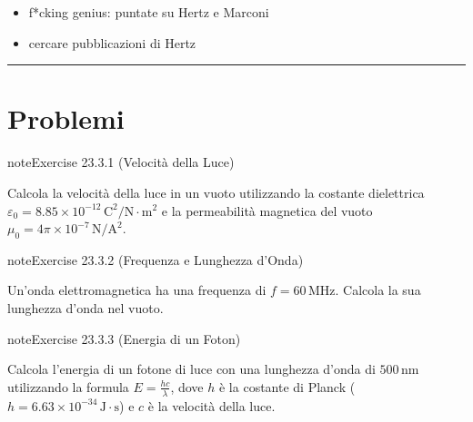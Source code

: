 \documentclass[letterpaper,10pt,italian]{jupyterBook}
\begin{document}
\sphinxAtStartPar
{}
\begin{itemize}
\item {} 
\sphinxAtStartPar
f*cking genius: puntate su Hertz e Marconi

\item {} 
\sphinxAtStartPar
cercare pubblicazioni di Hertz

\end{itemize}


\bigskip\hrule\bigskip


\sphinxstepscope


\section{Problemi}
\label{\detokenize{ch/electromagnetism/em-waves-problems:problemi}}\label{\detokenize{ch/electromagnetism/em-waves-problems:physics-hs-electromagnetism-em-waves-problems}}\label{\detokenize{ch/electromagnetism/em-waves-problems::doc}} \label{exercise:ch/electromagnetism/em-waves-problems-exercise-0}

\begin{sphinxadmonition}{note}{Exercise 23.3.1 (Velocità della Luce)}



\sphinxAtStartPar
Calcola la velocità della luce in un vuoto utilizzando la costante dielettrica \(\varepsilon_0 = 8.85 \times 10^{-12} \, \text{C}^2/\text{N} \cdot \text{m}^2\) e la permeabilità magnetica del vuoto \(\mu_0 = 4\pi \times 10^{-7} \, \text{N}/\text{A}^2\).
\end{sphinxadmonition}
 \label{exercise:ch/electromagnetism/em-waves-problems-exercise-1}

\begin{sphinxadmonition}{note}{Exercise 23.3.2 (Frequenza e Lunghezza d’Onda)}



\sphinxAtStartPar
Un’onda elettromagnetica ha una frequenza di \(f = 60 \, \text{MHz}\). Calcola la sua lunghezza d’onda nel vuoto.
\end{sphinxadmonition}
 \label{exercise:ch/electromagnetism/em-waves-problems-exercise-2}

\begin{sphinxadmonition}{note}{Exercise 23.3.3 (Energia di un Foton)}



\sphinxAtStartPar
Calcola l’energia di un fotone di luce con una lunghezza d’onda di \(500 \, \text{nm}\) utilizzando la formula \(E = \frac{h c}{\lambda}\), dove \(h\) è la costante di Planck (\(h = 6.63 \times 10^{-34} \, \text{J} \cdot \text{s}\)) e \(c\) è la velocità della luce.
\end{sphinxadmonition}
 \label{exercise:ch/electromagnetism/em-waves-problems-exercise-3}
\end{document}
